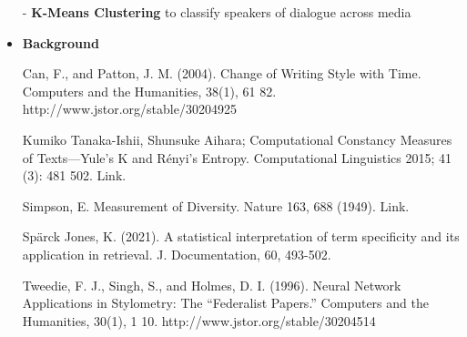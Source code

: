 \documentclass{article}
\begin{document}
\begin{titlepage}
\begin{itemize}
- \textbf{K-Means Clustering} to classify speakers of dialogue across media

\item[] \textbf{Background}

Can, F., and Patton, J. M. (2004). Change of Writing Style with Time. Computers and the Humanities, 38(1), 61 82. http://www.jstor.org/stable/30204925

Kumiko Tanaka-Ishii, Shunsuke Aihara; Computational Constancy Measures of Texts—Yule's K and Rényi's Entropy. Computational Linguistics 2015; 41 (3): 481 502. Link.

Simpson, E. Measurement of Diversity. Nature 163, 688 (1949). Link. 

Spärck Jones, K. (2021). A statistical interpretation of term specificity and its application in retrieval. J. Documentation, 60, 493-502.

Tweedie, F. J., Singh, S., and Holmes, D. I. (1996). Neural Network Applications in Stylometry: The “Federalist Papers.” Computers and the Humanities, 30(1), 1 10. http://www.jstor.org/stable/30204514
   

    \end{itemize}
	
	\pagebreak

\end{titlepage}
\end{document}
